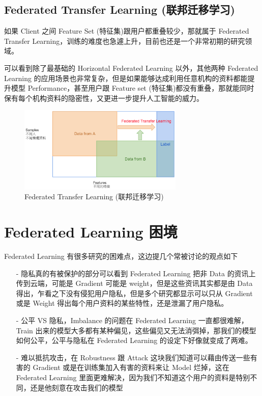 \subsection{Federated Transfer Learning (联邦迁移学习)}

如果 Client 之间 Feature Set (特征集)跟用户都重叠较少，那就属于 Federated Transfer Learning，训练的难度也急遽上升，目前也还是一个非常初期的研究领域。

可以看到除了最基础的 Horizontal Federated Learning 以外，其他两种 Federated Learning 的应用场景也非常复杂，但是如果能够达成利用任意机构的资料都能提升模型 Performance，甚至用户跟 Feature set (特征集)都没有重叠，那就能同时保有每个机构资料的隐密性，又更进一步提升人工智能的威力。

\begin{figure}[htb]
\centering 
\includegraphics[width=0.70\textwidth]{img/newch2m5.png} 
\caption{Federated Transfer Learning (联邦迁移学习)}
\label{Test}
\end{figure}

\section{Federated Learning 困境}

Federated Learning 有很多研究的困难点，这边提几个常被讨论的观点如下

\begin{itemize}
\item [-] 隐私真的有被保护的部分可以看到 Federated Learning 把非 Data 的资讯上传到云端，可能是 Gradient 可能是 weight，但是这些资讯其实都是由 Data 得出，乍看之下没有侵犯用户隐私，但是多个研究都显示可以只从 Gradient 或是 Weight 得出每个用户资料的某些特性，还是泄漏了用户隐私。
\item [-] 公平 VS 隐私，Imbalance 的问题在 Federated Learning 一直都很难解，Train 出来的模型大多都有某种偏见，这些偏见又无法消弭掉，那我们的模型如何公平，公平与隐私在 Federated Learning 的设定下好像就变成了两难。
\item [-] 难以抵抗攻击，在 Robustness 跟 Attack 这块我们知道可以藉由传送一些有害的 Gradient 或是在训练集加入有害的资料来让 Model 烂掉，这在 Federated Learning 里面更难解决，因为我们不知道这个用户的资料是特别不同，还是他刻意在攻击我们的模型
\end{itemize}
